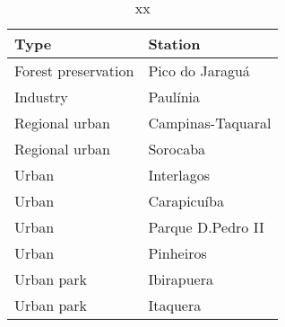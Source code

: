 \begin{table}
\centering
\caption{xx}
\label{tab:xx}
\begin{tabular}{ll}
\toprule
               Type &           Station \\
\midrule
Forest preservation &   Pico do Jaraguá \\
           Industry &          Paulínia \\
     Regional urban & Campinas-Taquaral \\
     Regional urban &          Sorocaba \\
              Urban &        Interlagos \\
              Urban &       Carapicuíba \\
              Urban & Parque D.Pedro II \\
              Urban &         Pinheiros \\
         Urban park &        Ibirapuera \\
         Urban park &          Itaquera \\
\bottomrule
\end{tabular}
\end{table}

